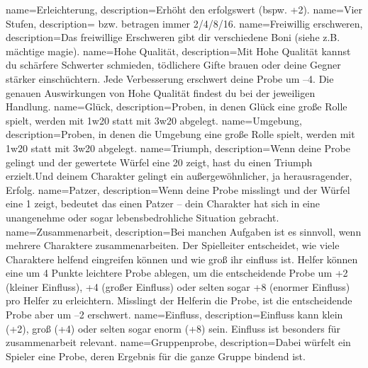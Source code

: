 {
    name={Erleichterung},
    description={Erhöht den \gls{erfolgswert} (bspw. +2).}}
{
    name={Vier Stufen},
    description={ bzw.  betragen immer 2/4/8/16.}}
{
    name={Freiwillig erschweren},
    description={Das freiwillige Erschweren gibt dir verschiedene Boni (siehe z.B. \gls{mächtige magie}).}}
{
    name={Hohe Qualität},
    description={Mit Hohe Qualität kannst du schärfere Schwerter schmieden, tödlichere Gifte brauen oder deine Gegner stärker einschüchtern. Jede Verbesserung erschwert deine Probe um –4. Die genauen Auswirkungen von Hohe Qualität findest du bei der jeweiligen Handlung.}}
{
    name={Glück},
    description={Proben, in denen Glück eine große Rolle spielt, werden mit \gls{1w20} statt mit \gls{3w20} abgelegt.}}
{
    name={Umgebung},
    description={Proben, in denen die Umgebung eine große Rolle spielt, werden mit \gls{1w20} statt mit \gls{3w20} abgelegt.}}
{
    name={Triumph},
    description={Wenn deine Probe gelingt und der gewertete Würfel eine 20 zeigt, hast du einen Triumph erzielt.Und deinem Charakter gelingt ein außergewöhnlicher, ja herausragender, Erfolg.}}
{
    name={Patzer},
    description={Wenn deine Probe misslingt und der Würfel eine 1 zeigt, bedeutet das einen Patzer – dein Charakter hat sich in eine unangenehme oder sogar lebensbedrohliche Situation gebracht.}}
{
    name={Zusammenarbeit},
    description={Bei manchen Aufgaben ist es sinnvoll, wenn mehrere Charaktere zusammenarbeiten. Der Spielleiter entscheidet,
wie viele Charaktere helfend eingreifen können und wie groß ihr \gls{einfluss} ist. Helfer können eine um 4 Punkte leichtere Probe ablegen, um die entscheidende Probe um +2 (kleiner Einfluss), +4 (großer Einfluss) oder selten sogar +8 (enormer Einfluss) pro Helfer zu erleichtern. Misslingt der Helferin die Probe, ist die entscheidende Probe aber um –2 erschwert.}}
{
    name={Einfluss},
    description={Einfluss kann klein (+2), groß (+4) oder selten sogar enorm (+8) sein. Einfluss ist besonders für \gls{zusammenarbeit} relevant.}}
{
    name={Gruppenprobe},
    description={Dabei würfelt ein Spieler eine Probe, deren Ergebnis für die ganze Gruppe bindend ist.}}

